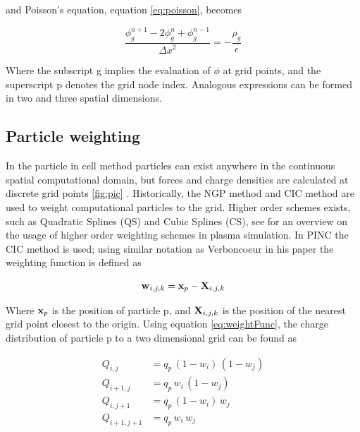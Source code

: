 and Poisson's equation, equation \ref{eq:poisson}, becomes

\begin{equation}\label{eq:poissonDescrete}
    \frac{\phi^{n+1}_g - 2\phi^n_g + \phi^{n-1}_g}{{\Delta x}^2} = - \frac{\rho_g}{\epsilon}
\end{equation}


Where the subscript g implies the evaluation of $\phi$ at grid points, and the superscript p denotes the grid node index. Analogous expressions can be formed in two and three spatial dimensions.

\subsection{Particle weighting}
In the particle in cell method particles can exist anywhere in the continuous spatial computational domain, but forces and charge densities are calculated at discrete grid points \ref{fig:pic} .  Historically, the NGP method and CIC method are used to weight computational particles to the grid. Higher order schemes exists, such as Quadratic Splines (QS) and Cubic Splines (CS), see  for an overview on the usage of higher order weighting schemes in plasma simulation. In PINC the CIC method is used; using similar notation as Verboncoeur in his paper  the weighting function is defined as 

\begin{equation}\label{eq:weightFunc}
    \vb{w}_{i,j,k} = \vb{x}_p - \vb{X}_{i,j,k}
\end{equation}

Where $\vb{x}_p$ is the position of particle p, and $\vb{X}_{i,j,k}$ is the position of the nearest grid point closest to the origin. Using equation \ref{eq:weightFunc}, the charge distribution of particle p to a two dimensional grid can be found as

\begin{subequations}
    \begin{align*}
        Q_{i,j} &= q_p \, (1 - w_i) \, (1 - w_j) \\
        Q_{i+1,j} &= q_p \, w_i \, (1 - w_j) \\
        Q_{i,j+1} &= q_p \, (1 - w_i) \, w_j \\
        Q_{i+1,j+1} &= q_p \, w_i \, w_j 
    \end{align*}
\end{subequations}

